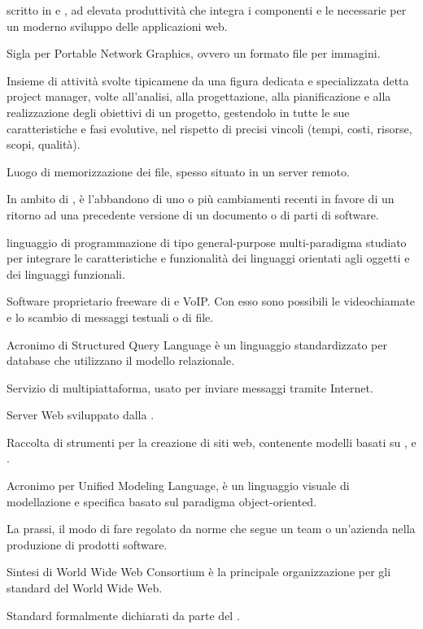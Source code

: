   scritto in  e , ad elevata produttivit\`a che integra i componenti e le  necessarie per un moderno sviluppo delle applicazioni web.

Sigla per Portable Network Graphics, ovvero un formato file per immagini.

Insieme di attività svolte tipicamene da una figura dedicata e specializzata detta project manager, volte all'analisi, alla progettazione, alla pianificazione e alla realizzazione degli obiettivi di un progetto, gestendolo in tutte le sue caratteristiche e fasi evolutive, nel rispetto di precisi vincoli (tempi, costi, risorse, scopi, qualità).
\clearpage

Luogo di memorizzazione dei file, spesso situato in un server remoto.

In ambito di , è l'abbandono di uno o più cambiamenti recenti in favore di un ritorno ad una precedente versione di un documento o di parti di software.
\clearpage

linguaggio di programmazione di tipo general-purpose multi-paradigma studiato per integrare le caratteristiche e funzionalit\`a dei linguaggi orientati agli oggetti e dei linguaggi funzionali.

Software proprietario freeware di  e VoIP. Con esso sono possibili le videochiamate e lo scambio di messaggi testuali o di file.

Acronimo di Structured Query Language \`e un linguaggio standardizzato per database che utilizzano il modello relazionale.
\clearpage

Servizio di  multipiattaforma, usato per inviare messaggi tramite Internet.

Server Web  sviluppato dalla . 

Raccolta di strumenti per la creazione di siti web, contenente modelli basati su ,  e .
\clearpage

Acronimo per Unified Modeling Language, è un linguaggio visuale di modellazione e specifica basato sul paradigma object-oriented.
\clearpage

La prassi, il modo di fare regolato da norme che segue un team o un'azienda nella produzione di prodotti software.

Sintesi di World Wide Web Consortium \`e la principale organizzazione per gli standard del World Wide Web.

Standard formalmente dichiarati da parte del .
\clearpage


